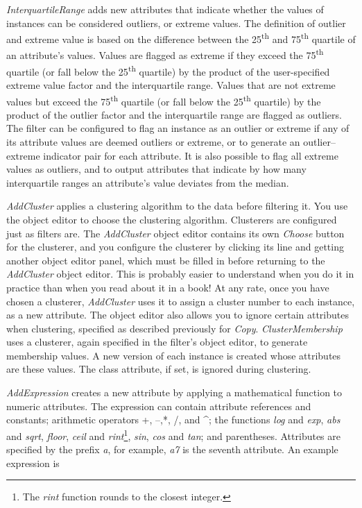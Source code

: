 \textit{InterquartileRange} adds new attributes that indicate whether
the values of instances can be considered outliers, or extreme
values. The definition of outlier and extreme value is based on the
difference between the 25\textsuperscript{th} and
75\textsuperscript{th} quartile of an attribute’s values. Values are
flagged as extreme if they exceed the 75\textsuperscript{th} quartile
(or fall below the 25\textsuperscript{th} quartile) by the product of
the user-specified extreme value factor and the interquartile
range. Values that are not extreme values but exceed the
75\textsuperscript{th} quartile (or fall below the
25\textsuperscript{th} quartile) by the product of the outlier factor
and the interquartile range are flagged as outliers. The filter can be
configured to flag an instance as an outlier or extreme if any of its
attribute values are deemed outliers or extreme, or to generate an
outlier–extreme indicator pair for each attribute. It is also possible
to flag all extreme values as outliers, and to output attributes that
indicate by how many interquartile ranges an attribute’s value
deviates from the median.

\textit{AddCluster} applies a clustering algorithm to the data before
filtering it. You use the object editor to choose the clustering
algorithm. Clusterers are configured just as filters are. The
\textit{AddCluster} object editor contains its own \textit{Choose}
button for the clusterer, and you configure the clusterer by clicking
its line and getting another object editor panel, which must be filled
in before returning to the \textit{AddCluster} object editor. This is
probably easier to understand when you do it in practice than when you
read about it in a book! At any rate, once you have chosen a
clusterer, \textit{AddCluster} uses it to assign a cluster number to
each instance, as a new attribute. The object editor also allows you
to ignore certain attributes when clustering, specified as described
previously for \textit{Copy}. \textit{ClusterMembership} uses a
clusterer, again specified in the filter’s object editor, to generate
membership values. A new version of each instance is created whose
attributes are these values. The class attribute, if set, is ignored
during clustering.

\textit{AddExpression} creates a new attribute by applying a
mathematical function to numeric attributes. The expression can
contain attribute references and constants; arithmetic operators +,
--,*, /, and \string^; the functions \textit{log} and \textit{exp},
\textit{abs} and \textit{sqrt}, \textit{floor}, \textit{ceil} and
\textit{rint}\footnote{The \textit{rint} function rounds to the
  closest integer.}, \textit{sin}, \textit{cos} and \textit{tan}; and
parentheses. Attributes are specified by the prefix \textit{a}, for
example, \textit{a7} is the seventh attribute. An example expression
is \newline

